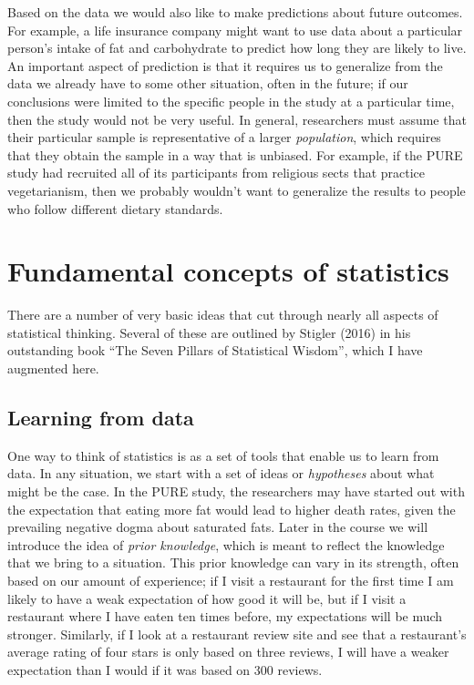 \documentclass[]{book}
\theoremstyle{definition}
\theoremstyle{definition}
\theoremstyle{definition}
\theoremstyle{remark}
\begin{document}
Based on the data we would also like to make predictions about future
outcomes. For example, a life insurance company might want to use data
about a particular person's intake of fat and carbohydrate to predict
how long they are likely to live. An important aspect of prediction is
that it requires us to generalize from the data we already have to some
other situation, often in the future; if our conclusions were limited to
the specific people in the study at a particular time, then the study
would not be very useful. In general, researchers must assume that their
particular sample is representative of a larger \emph{population}, which
requires that they obtain the sample in a way that is unbiased. For
example, if the PURE study had recruited all of its participants from
religious sects that practice vegetarianism, then we probably wouldn't
want to generalize the results to people who follow different dietary
standards.

\section{Fundamental concepts of
statistics}\label{fundamental-concepts-of-statistics}

There are a number of very basic ideas that cut through nearly all
aspects of statistical thinking. Several of these are outlined by
Stigler (2016) in his outstanding book ``The Seven Pillars of
Statistical Wisdom'', which I have augmented here.

\subsection{Learning from data}\label{learning-from-data}

One way to think of statistics is as a set of tools that enable us to
learn from data. In any situation, we start with a set of ideas or
\emph{hypotheses} about what might be the case. In the PURE study, the
researchers may have started out with the expectation that eating more
fat would lead to higher death rates, given the prevailing negative
dogma about saturated fats. Later in the course we will introduce the
idea of \emph{prior knowledge}, which is meant to reflect the knowledge
that we bring to a situation. This prior knowledge can vary in its
strength, often based on our amount of experience; if I visit a
restaurant for the first time I am likely to have a weak expectation of
how good it will be, but if I visit a restaurant where I have eaten ten
times before, my expectations will be much stronger. Similarly, if I
look at a restaurant review site and see that a restaurant's average
rating of four stars is only based on three reviews, I will have a
weaker expectation than I would if it was based on 300 reviews.
\end{document}
